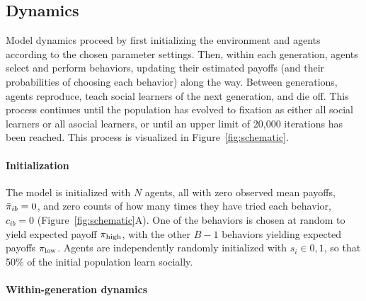 \documentclass[letterpaper,11.5pt]{scrartcl}
\begin{document}
\subsection{Dynamics}

Model dynamics proceed by first initializing the environment and agents according
to the chosen parameter settings. %
Then, within each generation, agents select and perform behaviors, updating their estimated payoffs (and their probabilities of choosing each behavior) along the way.
Between generations, agents reproduce, teach social learners of the next generation, and die off. 
This process continues until the population has evolved to fixation as either all social learners or all asocial learners, or until an upper limit of 20,000 
iterations has been reached. This process is visualized in
Figure~\ref{fig:schematic}.


\paragraph{Initialization}

The model is initialized with $N$ agents, all with zero observed mean payoffs, 
$\bar\pi_{ib} = 0$, and zero counts of how many times
they have tried each behavior, $c_{ib} = 0$ (Figure~\ref{fig:schematic}A).
One of the behaviors is chosen at random to yield expected payoff $\pi_{\mathrm{high}}$, with the other $B-1$ behaviors yielding
expected payoffs $\pi_{\mathrm{low}}$. Agents are independently randomly initialized with $s_i
\in 0,1$, so that 50\% of the initial population learn socially.


\paragraph{Within-generation dynamics}
\end{document}
